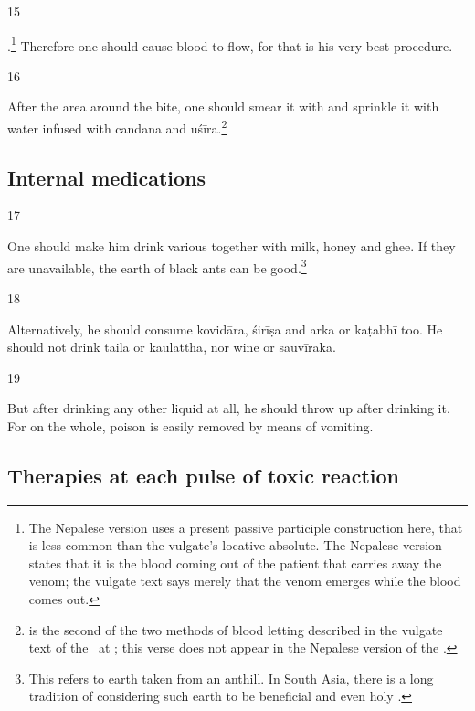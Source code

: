 \begin{translation}
\item [15] 

.\footnote{The
    Nepalese version uses a present passive participle construction here,
    that is less common than the vulgate's locative absolute.  The Nepalese 
    version states that it is the blood coming out of the patient that carries away 
    the venom; the vulgate text says merely that the venom emerges while the 
    blood comes out.} Therefore one
    should cause blood to flow, for that is his very best procedure.

\item [16]  

After  the area around the bite, one should smear
it with  and sprinkle it with water infused with
\gls{candana} and \gls{uśīra}.\footnote{ is the second of
    the two methods of blood letting  described in the vulgate text of the \SS\ at 
    ; this verse does not appear in the Nepalese version of the 
    \SS.}

\subsection{Internal medications}

\item [17]

One should make him drink various  together with
milk, honey and ghee. If they are unavailable, the earth of black ants
can be good.\footnote{This refers to earth taken from an anthill.  In
    South Asia, there is a long tradition of considering such earth to be
    beneficial and even holy \citep[e.g.,][]{irwi-1982}.}


\item [18]

Alternatively, he should consume \gls{kovidāra}, \gls{śirīṣa}
and \gls{arka} or \gls{kaṭabhī} too.  He should not drink \gls{taila} or
\gls{kaulattha}, nor wine or  \gls{sauvīraka}.


\item [19]

But after drinking any other liquid at all, he should throw up after drinking it.  For 
on the whole, poison is easily removed by means of vomiting. 

\subsection{Therapies at each pulse of toxic reaction}


\end{translation}
